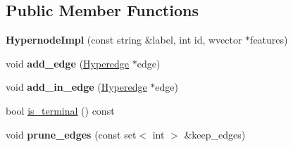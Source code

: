 \subsection*{Public Member Functions}
\begin{DoxyCompactItemize}
\item 
\hypertarget{classScarab_1_1HG_1_1HypernodeImpl_a574c6f1386fb27894075977ef1ca56d6}{
{\bfseries HypernodeImpl} (const string \&label, int id, wvector $\ast$features)}
\label{classScarab_1_1HG_1_1HypernodeImpl_a574c6f1386fb27894075977ef1ca56d6}

\item 
\hypertarget{classScarab_1_1HG_1_1HypernodeImpl_a0899a4e97f535c2f005d7c5ab5364681}{
void {\bfseries add\_\-edge} (\hyperlink{classScarab_1_1HG_1_1Hyperedge}{Hyperedge} $\ast$edge)}
\label{classScarab_1_1HG_1_1HypernodeImpl_a0899a4e97f535c2f005d7c5ab5364681}

\item 
\hypertarget{classScarab_1_1HG_1_1HypernodeImpl_ab05500702d5fa1c896efe941f9c54bf3}{
void {\bfseries add\_\-in\_\-edge} (\hyperlink{classScarab_1_1HG_1_1Hyperedge}{Hyperedge} $\ast$edge)}
\label{classScarab_1_1HG_1_1HypernodeImpl_ab05500702d5fa1c896efe941f9c54bf3}

\item 
bool \hyperlink{classScarab_1_1HG_1_1HypernodeImpl_a2bb4b33ff207c3c1babe135b9af6323e}{is\_\-terminal} () const 
\item 
\hypertarget{classScarab_1_1HG_1_1HypernodeImpl_a6675d677bd7e794ae9a8bf72645b828a}{
void {\bfseries prune\_\-edges} (const set$<$ int $>$ \&keep\_\-edges)}
\label{classScarab_1_1HG_1_1HypernodeImpl_a6675d677bd7e794ae9a8bf72645b828a}


\end{DoxyCompactItemize}
